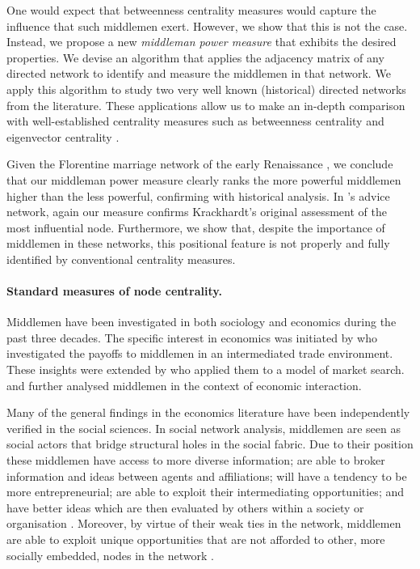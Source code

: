 \documentclass[11pt,fleqn]{article}
\begin{document}
One would expect that betweenness centrality measures would capture the influence that such middlemen exert. However, we show that this is not the case. Instead, we propose a new \emph{middleman power measure} that exhibits the desired properties. We devise an algorithm that applies the adjacency matrix of any directed network to identify and measure the middlemen in that network. We apply this algorithm to study two very well known (historical) directed networks from the literature. These applications allow us to make an in-depth comparison with well-established centrality measures such as betweenness centrality and eigenvector centrality \citep{Bonacich1987}.

Given the Florentine marriage network of the early Renaissance \citep{Padgett1993, Padgett1994}, we conclude that our middleman power measure clearly ranks the more powerful middlemen higher than the less powerful, confirming with historical analysis.  In \citet{Krackhardt1987}'s advice network, again our measure confirms Krackhardt's original assessment of the most influential node. Furthermore, we show that, despite the importance of middlemen in these networks, this positional feature is not properly and fully identified by conventional centrality measures.

\paragraph{Standard measures of node centrality.}

Middlemen have been investigated in both sociology and economics during the past three decades. The specific interest in economics was initiated by \citet{KalaiMiddlemen1978} who investigated the payoffs to middlemen in an intermediated trade environment. These insights were extended by \citet{RubinsteinWolinsky1987} who applied them to a model of market search. \citet{JacksonWolinsky1996} and \citet{GillesChakrabarti2006} further analysed middlemen in the context of economic interaction.

Many of the general findings in the economics literature have been independently verified in the social sciences. In social network analysis, middlemen are seen as social actors that bridge structural holes in the social fabric. Due to their position these middlemen have access to more diverse information; are able to broker information and ideas between agents and affiliations; will have a tendency to be more entrepreneurial; are able to exploit their intermediating opportunities; and have better ideas which are then evaluated by others within a society or organisation \citep{Burt1992, Burt2004, Burt2005, Burt2010}. Moreover, by virtue of their weak ties in the network, middlemen are able to exploit unique opportunities that are not afforded to other, more socially embedded, nodes in the network \citep{Granovetter1973, Granovetter2005}.
\end{document}
